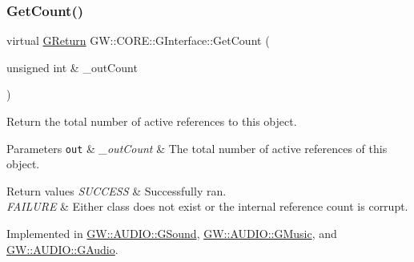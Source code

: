 \mbox{\label{classGW_1_1CORE_1_1GInterface_aacf5834174a7024f8a3c361122ee9e76}} 
\subsubsection{\texorpdfstring{Get\+Count()}{GetCount()}}
{\footnotesize\ttfamily virtual \mbox{\hyperlink{namespaceGW_a67a839e3df7ea8a5c5686613a7a3de21}{G\+Return}} G\+W\+::\+C\+O\+R\+E\+::\+G\+Interface\+::\+Get\+Count (\begin{DoxyParamCaption}\item[{unsigned int \&}]{\+\_\+out\+Count }\end{DoxyParamCaption})\hspace{0.3cm}{\ttfamily [pure virtual]}}



Return the total number of active references to this object. 


\begin{DoxyParams}[1]{Parameters}
\mbox{\tt out}  & {\em \+\_\+out\+Count} & The total number of active references of this object.\\
\hline
\end{DoxyParams}

\begin{DoxyRetVals}{Return values}
{\em S\+U\+C\+C\+E\+SS} & Successfully ran. \\
\hline
{\em F\+A\+I\+L\+U\+RE} & Either class does not exist or the internal reference count is corrupt. \\
\hline
\end{DoxyRetVals}


Implemented in \mbox{\hyperlink{classGW_1_1AUDIO_1_1GSound_afbac022010da2fc1a917ece2803a36a4}{G\+W\+::\+A\+U\+D\+I\+O\+::\+G\+Sound}}, \mbox{\hyperlink{classGW_1_1AUDIO_1_1GMusic_ae41f54531b8325848215596fb2f821ac}{G\+W\+::\+A\+U\+D\+I\+O\+::\+G\+Music}}, and \mbox{\hyperlink{classGW_1_1AUDIO_1_1GAudio_a079dfab7b9db1536b10c9d2afa20c89c}{G\+W\+::\+A\+U\+D\+I\+O\+::\+G\+Audio}}.

\mbox{\label{classGW_1_1CORE_1_1GInterface_a2d710f20bb78e544e8309b5b75c21260}} 
